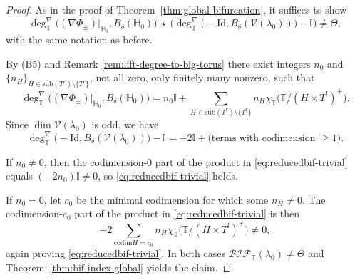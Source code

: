 \documentclass[10pt,a4paper]{amsart}
\newcommand{\bH}{\mathbb{H}}
\newcommand{\bI}{\mathbb{I}}
\newcommand{\bT}{\mathbb{T}}
\newcommand{\bif}{\mathcal{BIF}}
\newcommand{\cV}{\mathcal{V}}
\newcommand{\codim}{\mathrm{ codim  }}
\newcommand{\sub}{\overline{\mathrm{sub}}}
\begin{document}
\begin{proof}
 As in the proof of Theorem~\ref{thm:global-bifurcation}, it suffices to show
\begin{equation}\label{eq:reducedbif-trivial}
\deg^{\nabla}_{\bT}\bigl((\nabla\Phi_{\pm})|_{\bH_0},B_{\delta}(\bH_0)\bigr)
\ \star\
\bigl(\deg^{\nabla}_{\bT}\bigl(-\mathrm{Id},B_{\delta}(\cV(\lambda_{0}))\bigr)-\bI\bigr)
\ne \Theta,
\end{equation}
with the same notation as before.

By (B5) and Remark \ref{rem:lift-degree-to-big-torus} there exist integers $n_0$ and $\{n_H\}_{H\in\sub(T^r)\setminus\{T^r\}}$, not all zero, only finitely many nonzero, such that
\[
\deg^{\nabla}_{\bT}\bigl((\nabla\Phi_{\pm})|_{\bH_0},B_{\delta}(\bH_0)\bigr)
=
n_0 \bI+\sum_{H\in\sub(T^r)\setminus\{T^r\}}n_H \chi_{\bT}\bigl(\bT/(H\times T^l)^+\bigr).
\]
Since $\dim\cV(\lambda_0)$ is odd, we have
\[
\deg^{\nabla}_{\bT}\bigl(-\mathrm{Id},B_{\delta}(\cV(\lambda_{0}))\bigr)-\bI
= -2 \bI+\text{(terms with codimension $\ge1$)}.
\]

If $n_0\neq 0$, then the codimension-$0$ part of the product in \eqref{eq:reducedbif-trivial} equals $(-2n_0)\bI\neq 0$, so \eqref{eq:reducedbif-trivial} holds.

If $n_0=0$, let $c_0$ be the minimal codimension for which some $n_H\neq 0$. The codimension-$c_0$ part of the product in \eqref{eq:reducedbif-trivial} is then
\[
-2\sum_{\codim H=c_0} n_H \chi_{\bT}\bigl(\bT/(H\times T^l)^+\bigr)\neq 0,
\]
again proving \eqref{eq:reducedbif-trivial}. In both cases $\bif_{\bT}(\lambda_0)\neq\Theta$ and Theorem~\ref{thm:bif-index-global} yields the claim.
\end{proof}
\end{document}
